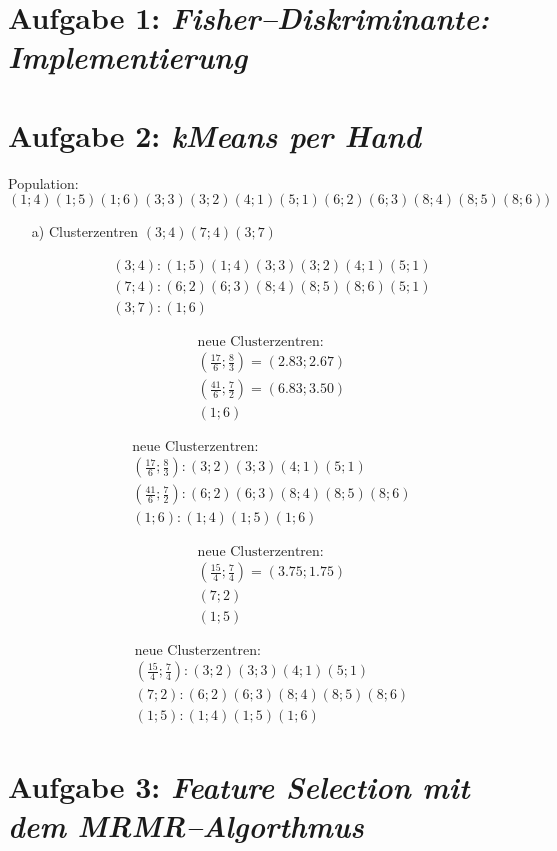  

\section*{Aufgabe 1: \emph{Fisher--Diskriminante: Implementierung}}

\section*{Aufgabe 2: \emph{kMeans per Hand}}

Population: $(1;4) (1;5) (1;6) (3;3) (3;2) (4;1) (5;1) (6;2) (6;3) (8;4) (8;5) (8;6))$

\begin{itemize}
\item[a)] Clusterzentren $(3;4) (7;4) (3;7)$

\begin{align*}
(3;4): (1;5) (1;4) (3;3) (3;2) (4;1) (5;1)\\
(7;4): (6;2) (6;3) (8;4) (8;5) (8;6) (5;1)\\
(3;7): (1;6)
\end{align*}

\begin{align*}
\text{neue Clusterzentren:}\\
(\frac{17}{6}; \frac{8}{3} ) = (2.83; 2.67)\\
(\frac{41}{6}; \frac{7}{2} ) = (6.83; 3.50)\\
(1; 6 )
\end{align*}


\begin{align*}
\text{neue Clusterzentren:}\\
(\frac{17}{6}; \frac{8}{3} ):(3;2) (3;3) (4;1) (5;1) \\
(\frac{41}{6}; \frac{7}{2} ): (6;2) (6;3) (8;4) (8;5) (8;6) \\
(1; 6 ): (1;4) (1;5) (1;6) 
\end{align*}


\begin{align*}
\text{neue Clusterzentren:}\\
(\frac{15}{4}; \frac{7}{4} ) = (3.75; 1.75)\\
 (7; 2)\\
(1; 5 )
\end{align*}


\begin{align*}
\text{neue Clusterzentren:}\\
(\frac{15}{4}; \frac{7}{4} ):(3;2) (3;3) (4;1) (5;1) \\
 (7; 2): (6;2) (6;3) (8;4) (8;5) (8;6) \\
(1; 5 ): (1;4) (1;5) (1;6) 
\end{align*}

\end{itemize}
\section*{Aufgabe 3: \emph{Feature Selection mit dem MRMR--Algorthmus}}
